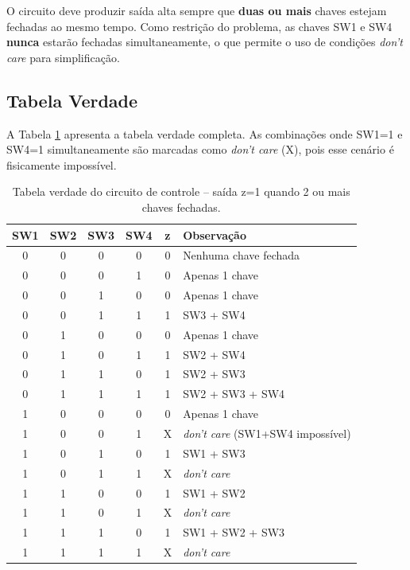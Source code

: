 \documentclass[12pt,a4paper, brazil]{article}
\begin{document}
O circuito deve produzir saída alta sempre que \textbf{duas ou mais} chaves estejam fechadas ao mesmo tempo. Como restrição do problema, as chaves SW1 e SW4 \textbf{nunca} estarão fechadas simultaneamente, o que permite o uso de condições \textit{don't care} para simplificação.

\subsection{Tabela Verdade}

A Tabela \ref{tab:verdade-ex2} apresenta a tabela verdade completa. As combinações onde SW1=1 e SW4=1 simultaneamente são marcadas como \textit{don't care} (X), pois esse cenário é fisicamente impossível.

\begin{table}[H]
\centering
\caption{Tabela verdade do circuito de controle -- saída z=1 quando 2 ou mais chaves fechadas.}
\label{tab:verdade-ex2}
\begin{tabular}{@{}cccc|c|l@{}}
\toprule
\textbf{SW1} & \textbf{SW2} & \textbf{SW3} & \textbf{SW4} & \textbf{z} & \textbf{Observação} \\
\midrule
0 & 0 & 0 & 0 & 0 & Nenhuma chave fechada \\
0 & 0 & 0 & 1 & 0 & Apenas 1 chave \\
0 & 0 & 1 & 0 & 0 & Apenas 1 chave \\
0 & 0 & 1 & 1 & 1 & SW3 + SW4 \\
0 & 1 & 0 & 0 & 0 & Apenas 1 chave \\
0 & 1 & 0 & 1 & 1 & SW2 + SW4 \\
0 & 1 & 1 & 0 & 1 & SW2 + SW3 \\
0 & 1 & 1 & 1 & 1 & SW2 + SW3 + SW4 \\
1 & 0 & 0 & 0 & 0 & Apenas 1 chave \\
1 & 0 & 0 & 1 & X & \textit{don't care} (SW1+SW4 impossível) \\
1 & 0 & 1 & 0 & 1 & SW1 + SW3 \\
1 & 0 & 1 & 1 & X & \textit{don't care} \\
1 & 1 & 0 & 0 & 1 & SW1 + SW2 \\
1 & 1 & 0 & 1 & X & \textit{don't care} \\
1 & 1 & 1 & 0 & 1 & SW1 + SW2 + SW3 \\
1 & 1 & 1 & 1 & X & \textit{don't care} \\
\bottomrule
\end{tabular}
\end{table}
\FloatBarrier
\end{document}
